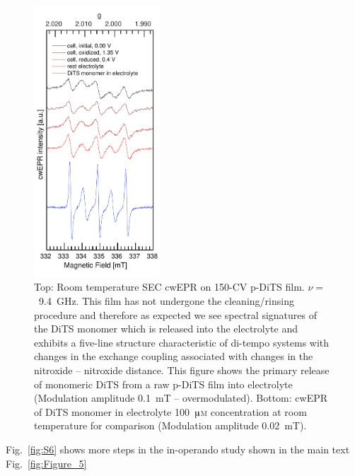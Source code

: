 \begin{figure}
\centering
\includegraphics[width=0.42\textwidth]{./operando_epr/figures/Figure_S5}
\caption{Top: Room temperature SEC cwEPR on 150-CV p-DiTS film. $\nu=$~9.4~GHz. This film has not undergone the cleaning/rinsing procedure and therefore as expected we see spectral signatures of the DiTS monomer which is released into the electrolyte and exhibits a five-line structure characteristic of di-tempo systems with changes in the exchange coupling associated with changes in the nitroxide -- nitroxide distance. This figure shows the primary release of monomeric DiTS from a raw p-DiTS film into electrolyte (Modulation amplitude 0.1~mT -- overmodulated). Bottom: cwEPR of DiTS monomer in electrolyte 100~$\muup$\textsc{m} concentration at room temperature for comparison (Modulation amplitude 0.02~mT).}
\label{fig:S5}
\end{figure}


Fig.~\ref{fig:S6} shows more steps in the in-operando study shown in the main text Fig.~\ref{fig:Figure_5}


